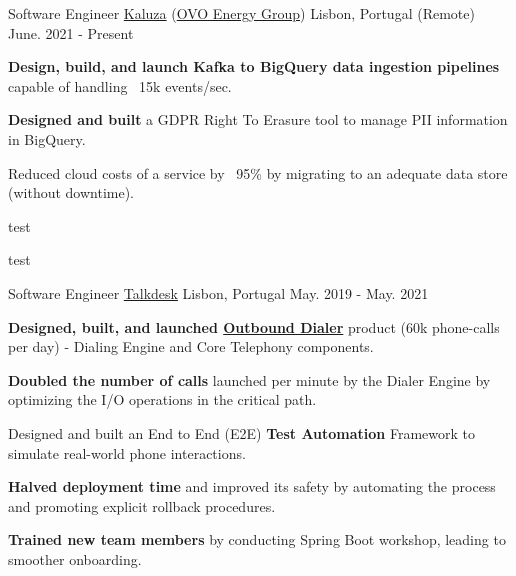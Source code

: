 
\begin{cventries}
  \vspace{-2mm}
  \cventry
    {Software Engineer}
    {\href{https://www.kaluza.com/}{Kaluza} (\href{https://www.ovoenergy.com/}{OVO Energy Group})}
    {Lisbon, Portugal (Remote)}
    {June. 2021 - Present}
    {
      \begin{cvitems}
        \item \textbf{Design, build, and launch Kafka to BigQuery data ingestion pipelines} capable of handling ~15k events/sec.
        \item \textbf{Designed and built} a GDPR Right To Erasure tool to manage PII information in BigQuery.
        \item Reduced cloud costs of a service by ~95\% by migrating to an adequate data store (without downtime).
        \item test
        \item test
      \end{cvitems}
      \vspace{4mm}
    }

  \cventry
    {Software Engineer}
    {\href{https://www.talkdesk.com/}{Talkdesk}}
    {Lisbon, Portugal}
    {May. 2019 - May. 2021}
    {
      \begin{cvitems}
        \item \textbf{Designed, built, and launched \href{https://www.youtube.com/watch?v=W9yJ6gi1ggA}{Outbound Dialer}} product (60k phone-calls per day) - Dialing Engine and Core Telephony components.
        \item \textbf{Doubled the number of calls} launched per minute by the Dialer Engine by optimizing the I/O operations in the critical path.
        \item Designed and built an End to End (E2E) \textbf{Test Automation} Framework to simulate real-world phone interactions.
        \item \textbf{Halved deployment time} and improved its safety by automating the process and promoting explicit rollback procedures.
        \item \textbf{Trained new team members} by conducting Spring Boot workshop, leading to smoother onboarding.
      \end{cvitems}
      \vspace{4mm}
    }
    

\end{cventries}
